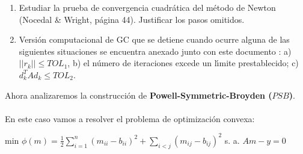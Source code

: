 \documentclass[12pt]{article}
\begin{document}
\begin{enumerate}
   \item Estudiar la prueba de convergencia cuadr\'atica del m\'etodo de Newton (Nocedal \& Wright, p\'agina 44). Justificar los pasos omitidos.

\item Versi\'on computacional de GC que se detiene cuando ocurre alguna de las siguientes situaciones se encuentra anexado junto con este documento : a) $||r_k|| \le TOL_1$, b) el n\'umero de iteraciones excede un l\'{\i}mite prestablecido; c) $d_k^TAd_k \le TOL_2$.
\end{enumerate}










Ahora analizaremos la construcci\'on de {\bf Powell-Symmetric-Broyden ($PSB$)}.
\\
\\
En este caso vamos a resolver el problema de optimizaci\'on convexa:
\begin{center}
min $\phi (m) = \frac{1}{2} \displaystyle \sum \limits_{i=1}^{n} (m_{ii} - b_{ii})^{2} + \displaystyle \sum \limits_{i<j} (m_{ij} - b_{ij})^{2}$
\newline
s. a. $Am-y=0$
\end{center}
\end{document}
